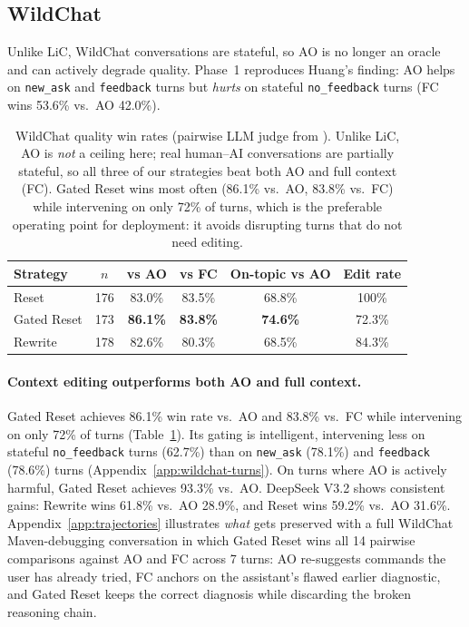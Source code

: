 \documentclass{article}
\begin{document}
\subsection{WildChat}
\label{sec:wildchat-results}

Unlike LiC, WildChat conversations are stateful, so AO is no longer an oracle and can actively degrade quality. Phase~1 reproduces Huang's finding: AO helps on \texttt{new\_ask} and \texttt{feedback} turns but \emph{hurts} on stateful \texttt{no\_feedback} turns (FC wins 53.6\% vs.\ AO 42.0\%).

\begin{table}[t]
\centering
\begin{tabular}{lccccc}
\toprule
\textbf{Strategy} & $n$ & \textbf{vs AO} & \textbf{vs FC} & \textbf{On-topic vs AO} & \textbf{Edit rate} \\
\midrule
Reset & 176 & 83.0\% & 83.5\% & 68.8\% & 100\% \\
Gated Reset & 173 & \textbf{86.1\%} & \textbf{83.8\%} & \textbf{74.6\%} & 72.3\% \\
Rewrite & 178 & 82.6\% & 80.3\% & 68.5\% & 84.3\% \\
\bottomrule
\end{tabular}
\caption{WildChat quality win rates (pairwise LLM judge from \citealt{huang2026context}). Unlike LiC, AO is \emph{not} a ceiling here; real human--AI conversations are partially stateful, so all three of our strategies beat both AO and full context (FC). Gated Reset wins most often (86.1\% vs.\ AO, 83.8\% vs.\ FC) while intervening on only 72\% of turns, which is the preferable operating point for deployment: it avoids disrupting turns that do not need editing.}
\label{tab:wildchat-quality}
\end{table}

\paragraph{Context editing outperforms both AO and full context.}
Gated Reset achieves 86.1\% win rate vs.\ AO and 83.8\% vs.\ FC while intervening on only 72\% of turns (Table~\ref{tab:wildchat-quality}). Its gating is intelligent, intervening less on stateful \texttt{no\_feedback} turns (62.7\%) than on \texttt{new\_ask} (78.1\%) and \texttt{feedback} (78.6\%) turns (Appendix~\ref{app:wildchat-turns}). On turns where AO is actively harmful, Gated Reset achieves 93.3\% vs.\ AO. DeepSeek V3.2 shows consistent gains: Rewrite wins 61.8\% vs.\ AO 28.9\%, and Reset wins 59.2\% vs.\ AO 31.6\%. Appendix~\ref{app:trajectories} illustrates \emph{what} gets preserved with a full WildChat Maven-debugging conversation in which Gated Reset wins all 14 pairwise comparisons against AO and FC across 7 turns: AO re-suggests commands the user has already tried, FC anchors on the assistant's flawed earlier diagnostic, and Gated Reset keeps the correct diagnosis while discarding the broken reasoning chain.
\end{document}
